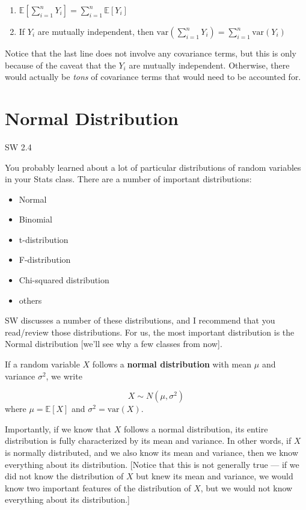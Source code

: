 \documentclass[
  letterpaper,
  DIV=11,
  numbers=noendperiod]{scrreprt}
\begin{document}
\begin{enumerate}
\def\labelenumi{\arabic{enumi}.}
\item
  \(\mathbb{E}\left[ \displaystyle \sum_{i=1}^n Y_i \right] = \displaystyle \sum_{i=1}^n \mathbb{E}[Y_i]\)
\item
  If \(Y_i\) are mutually independent, then
  \(\mathrm{var}\left( \displaystyle \sum_{i=1}^n Y_i \right) = \displaystyle \sum_{i=1}^n \mathrm{var}(Y_i)\)
\end{enumerate}

Notice that the last line does not involve any covariance terms, but
this is only because of the caveat that the \(Y_i\) are mutually
independent. Otherwise, there would actually be \emph{tons} of
covariance terms that would need to be accounted for.

\section{Normal Distribution}\label{normal-distribution}

SW 2.4

You probably learned about a lot of particular distributions of random
variables in your Stats class. There are a number of important
distributions:

\begin{itemize}
\item
  Normal
\item
  Binomial
\item
  t-distribution
\item
  F-distribution
\item
  Chi-squared distribution
\item
  others
\end{itemize}

SW discusses a number of these distributions, and I recommend that you
read/review those distributions. For us, the most important distribution
is the Normal distribution {[}we'll see why a few classes from now{]}.

If a random variable \(X\) follows a \textbf{normal distribution} with
mean \(\mu\) and variance \(\sigma^2\), we write

\[
  X \sim N(\mu, \sigma^2)
\] where \(\mu = \mathbb{E}[X]\) and \(\sigma^2 = \mathrm{var}(X)\).

Importantly, if we know that \(X\) follows a normal distribution, its
entire distribution is fully characterized by its mean and variance. In
other words, if \(X\) is normally distributed, and we also know its mean
and variance, then we know everything about its distribution. {[}Notice
that this is not generally true --- if we did not know the distribution
of \(X\) but knew its mean and variance, we would know two important
features of the distribution of \(X\), but we would not know everything
about its distribution.{]}
\end{document}
